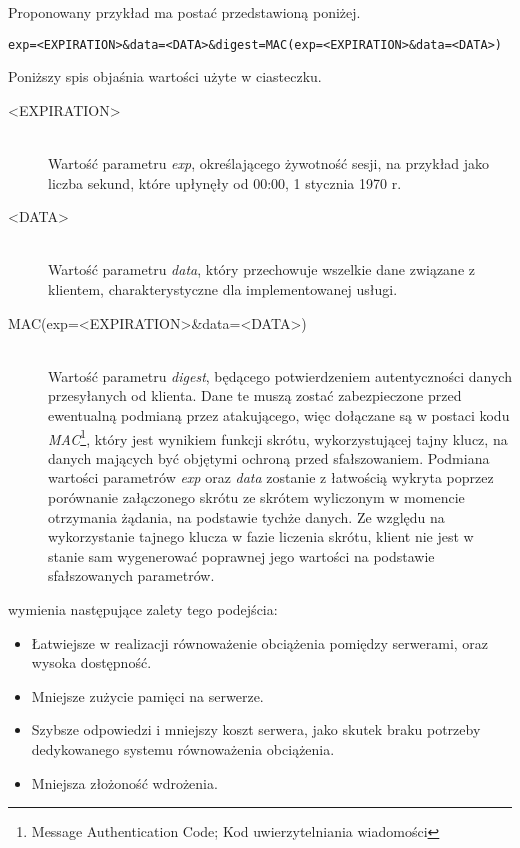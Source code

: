 \documentclass[11pt]{aghdpl}
\begin{document}
Proponowany przykład ma postać przedstawioną poniżej.
\begin{lstlisting}
exp=<EXPIRATION>&data=<DATA>&digest=MAC(exp=<EXPIRATION>&data=<DATA>)
\end{lstlisting}

Poniższy spis objaśnia wartości użyte w ciasteczku.
\begin{description}
\item[<EXPIRATION>] \hfill \\
Wartość parametru \emph{exp}, określającego żywotność sesji, na przykład jako liczba sekund, które upłynęły od 00:00, 1 stycznia 1970 r.
\item[<DATA>] \hfill \\
Wartość parametru \emph{data}, który przechowuje wszelkie dane związane z klientem, charakterystyczne dla implementowanej usługi.
\item[MAC(exp=<EXPIRATION>\&data=<DATA>)] \hfill \\
Wartość parametru \emph{digest}, będącego potwierdzeniem autentyczności danych przesyłanych od klienta. Dane te muszą zostać zabezpieczone przed ewentualną podmianą przez atakującego, więc dołączane są w postaci kodu \emph{MAC}\footnote{Message Authentication Code; Kod uwierzytelniania wiadomości}, który jest wynikiem funkcji skrótu, wykorzystującej tajny klucz, na danych mających być objętymi ochroną przed sfałszowaniem. Podmiana wartości parametrów \emph{exp} oraz \emph{data} zostanie z łatwością wykryta poprzez porównanie załączonego skrótu ze skrótem wyliczonym w momencie otrzymania żądania, na podstawie tychże danych. Ze względu na wykorzystanie tajnego klucza w fazie liczenia skrótu, klient nie jest w stanie sam wygenerować poprawnej jego wartości na podstawie sfałszowanych parametrów.
\end{description}

\cite{SeMa08} wymienia następujące zalety tego podejścia:
\begin{itemize}
	\item Łatwiejsze w realizacji równoważenie obciążenia pomiędzy serwerami, oraz wysoka dostępność.
	\item Mniejsze zużycie pamięci na serwerze.
	\item Szybsze odpowiedzi i mniejszy koszt serwera, jako skutek braku potrzeby dedykowanego systemu równoważenia obciążenia.
	\item Mniejsza złożoność wdrożenia.
\end{itemize}
\end{document}
